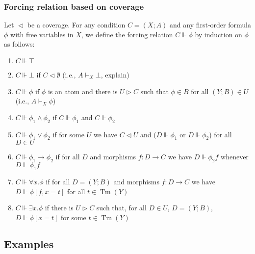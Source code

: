 \documentclass[handout,11pt]{beamer}
\newcommand{\es}{\emptyset}
\newcommand{\covd}{\mathrel{\vartriangleleft}}
\newcommand{\covs}{\mathrel{\vartriangleright}}
\DeclareMathOperator{\Tm}{Tm}
\begin{document}
\begin{frame}
\frametitle{Forcing relation based on coverage}

Let ${\covd}$ be a coverage. %
For any condition $C=(X;A)$ and any first-order formula
$\phi$ with free variables in $X$, we define the forcing relation
$C\Vdash\phi$ by induction on $\phi$ as follows:
\begin{enumerate}
\item $C\Vdash\top$

\item $C\Vdash\bot$ if $C\covd\es$ (i.e., $A\vdash_X \bot$, explain)

\item $C\Vdash\phi$ if $\phi$ is an atom and there is $U \covs C$ such that
$\phi\in B$ for all $(Y;B)\in U$ (i.e., $A\vdash_X \phi$)

\item $C\Vdash\phi_1 \land \phi_2$ if $C\Vdash\phi_1$ and $C\Vdash\phi_2$

\item $C\Vdash\phi_1 \lor \phi_2$ if for some $U$ we have
$C\covd U$ and ($D\Vdash\phi_1$ or $D\Vdash\phi_2$) for all $D\in U$

\item $C\Vdash\phi_1 \to \phi_2$ if for all $D$ and morphisms $f:D\to C$
we have $D\Vdash\phi_2f$ whenever $D\Vdash\phi_1f$

\item $C\Vdash\forall x.\phi$ if for all $D=(Y;B)$ and 
morphisms $f:D\to C$ we have 
 $D\Vdash\phi [f,x=t]$ for all $t\in\Tm(Y)$
 
\item $C\Vdash\exists x.\phi$ if there is $U\covs C$ such that,
for all $D\in U$, $D=(Y;B)$, $D\Vdash\phi[x=t]$ for some $t\in\Tm(Y)$

\end{enumerate}
\end{frame}

\subsection{Examples}
\end{document}
